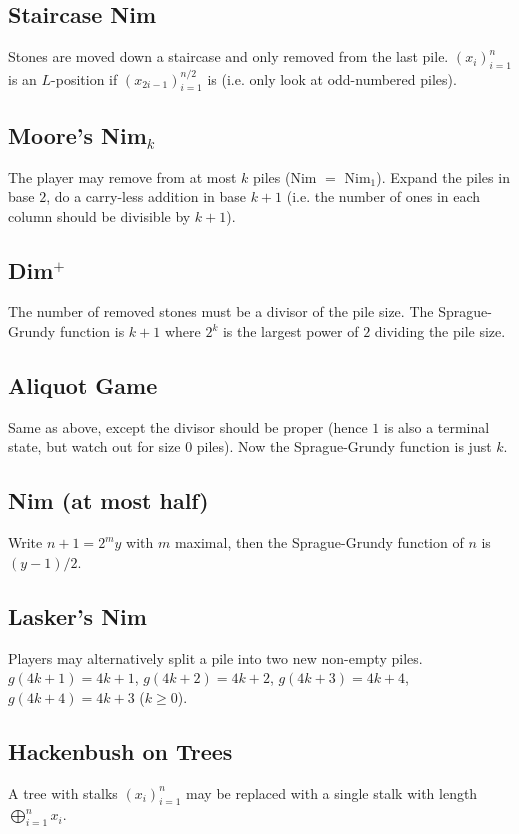 \subsection{Staircase Nim}
Stones are moved down a staircase and only removed from the last pile. $(x_i)_{i=1}^n$ is an $L$-position if $(x_{2i-1})_{i=1}^{n/2}$ is (i.e. only look at odd-numbered piles).

\subsection{Moore's Nim$_k$}
The player may remove from at most $k$ piles (Nim $=$ Nim$_1$). Expand the piles in base $2$, do a carry-less addition in base $k+1$ (i.e. the number of ones in each column should be divisible by $k+1$).

\subsection{Dim$^+$}
The number of removed stones must be a divisor of the pile size. The Sprague-Grundy function is $k+1$ where $2^k$ is the largest power of $2$ dividing the pile size.

\subsection{Aliquot Game}
Same as above, except the divisor should be proper (hence $1$ is also a terminal state, but watch out for size $0$ piles). Now the Sprague-Grundy function is just $k$.

\subsection{Nim (at most half)}
Write $n+1 = 2^my$ with $m$ maximal, then the Sprague-Grundy function of $n$ is $(y - 1) / 2$.

\subsection{Lasker's Nim}
Players may alternatively split a pile into two new non-empty piles. $g(4k+1) = 4k+1$, $g(4k+2) = 4k+2$, $g(4k+3) = 4k+4$, $g(4k+4) = 4k+3$ ($k\geq 0$).

\subsection{Hackenbush on Trees}
A tree with stalks $(x_i)_{i=1}^n$ may be replaced with a single stalk with length $\bigoplus_{i=1}^n x_i$.

\

	
